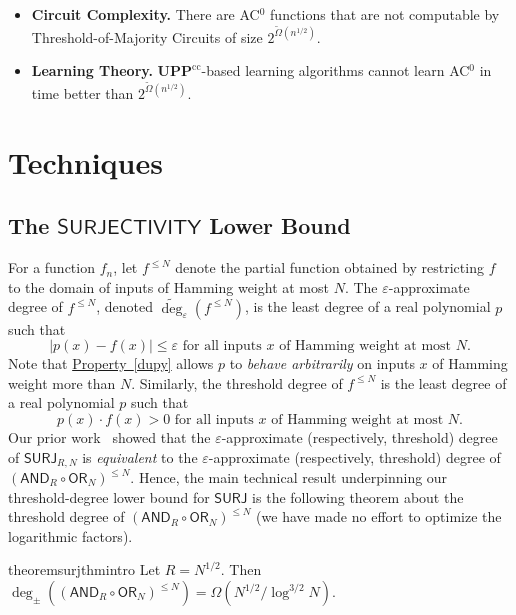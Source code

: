 \documentclass[11pt]{article}
\numberwithin{equation}{section}
\theoremstyle{definition}
\theoremstyle{plain}
\newcommand{\expeqref}[2]{\hyperref[#2]{#1~\eqref{#2}}}
\newcommand{\SURJ}{\mathsf{ SURJ}}
\newcommand{\OR}{\mathsf{ OR}}
\newcommand{\UPP}{\mathbf{UPP}}
\newcommand{\eps}{\varepsilon}
\newcommand{\adeg}{\widetilde{\operatorname{deg}}}
\newcommand{\AND}{\mathsf{AND}}
\begin{document}
\begin{itemize}
	\item \textbf{Circuit Complexity.} There are AC$^0$ functions that are not computable by Threshold-of-Majority Circuits of size $2^{\tilde{\Omega}(n^{1/2})}$.
	
	\item \textbf{Learning Theory.}  $\UPP^{\text{cc}}$-based learning algorithms cannot learn AC$^0$
	in time better than $2^{\tilde{\Omega}(n^{1/2})}$. 
\end{itemize}



\vspace{-4mm}
\section{Techniques} 
\subsection{The \texorpdfstring{$\mathsf{SURJECTIVITY}$}{SURJECTIVITY}
     Lower Bound}
\label{s:surjoverview}
For a function $f_n$, let $f^{\leq N}$ denote the partial function obtained by
restricting $f$ to the domain of inputs of Hamming weight at most $N$. 
The $\eps$-approximate degree of $f^{\leq N}$, denoted $\adeg_{\eps}(f^{\leq N})$, is the least degree of a 
real polynomial $p$ such that 
\begin{equation} \label{dupy} |p(x)-f(x)| \leq \eps \text{ for all inputs } x \text{ of Hamming weight at most } N. \end{equation}
Note that \expeqref{Property}{dupy} allows $p$ to \emph{behave arbitrarily} on inputs $x$ of Hamming weight more than $N$.
Similarly, the threshold degree of $f^{\leq N}$ is the least degree of a 
real polynomial $p$ such that 
\begin{equation*} p(x) \cdot f(x) > 0 \text{ for all inputs } x \text{ of Hamming weight at most } N. \end{equation*}
Our prior work~\cite{adegsurj} showed that the $\eps$-approximate (respectively, threshold) degree of $\SURJ_{R, N}$
is \emph{equivalent} to the $\eps$-approximate (respectively, threshold) degree of $(\AND_R \circ \OR_N)^{\leq N}$.
Hence, the main technical result underpinning our 
threshold-degree %
lower bound for $\SURJ$
is the following theorem about the threshold degree of $(\AND_R \circ \OR_N)^{\leq N}$ (we have made no effort to optimize the logarithmic factors).

\begin{restatable}{theorem}{surjthmintro}
	\label{surjthmintro} \label{surjthm}
	Let $R=N^{1/2}$. Then $\deg_{\pm}\left(\left(\AND_R \circ \OR_N\right)^{\leq N}\right) = \Omega(N^{1/2}/\log^{3/2} N)$.
\end{restatable}
\end{document}
